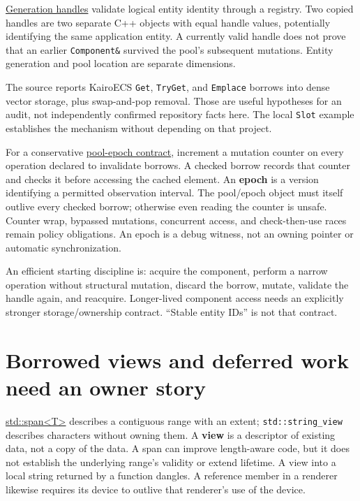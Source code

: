 \hyperref[appendix-f1581457d322]{Generation handles} validate logical entity identity through a registry. Two copied handles are two separate C++ objects with equal handle values, potentially identifying the same application entity. A currently valid handle does not prove that an earlier \texttt{Component\&} survived the pool's subsequent mutations. Entity generation and pool location are separate dimensions.

The source reports KairoECS \texttt{Get}, \texttt{TryGet}, and \texttt{Emplace} borrows into dense vector storage, plus swap-and-pop removal. Those are useful hypotheses for an audit, not independently confirmed repository facts here. The local \texttt{Slot} example establishes the mechanism without depending on that project.

For a conservative \hyperref[appendix-aa405b7c3903]{pool-epoch contract}, increment a mutation counter on every operation declared to invalidate borrows. A checked borrow records that counter and checks it before accessing the cached element. An \textbf{epoch} is a version identifying a permitted observation interval. The pool/epoch object must itself outlive every checked borrow; otherwise even reading the counter is unsafe. Counter wrap, bypassed mutations, concurrent access, and check-then-use races remain policy obligations. An epoch is a debug witness, not an owning pointer or automatic synchronization.

An efficient starting discipline is: acquire the component, perform a narrow operation without structural mutation, discard the borrow, mutate, validate the handle again, and reacquire. Longer-lived component access needs an explicitly stronger storage/ownership contract. ``Stable entity IDs'' is not that contract.

\section{Borrowed views and deferred work need an owner story}\label{01-foundations-i-ch003-borrowed-views-and-deferred-work-need-an-owner-story}

\hyperref[appendix-aea529eb5175]{std::span\textless T\textgreater{}} describes a contiguous range with an extent; \texttt{std::string\_view} describes characters without owning them. A \textbf{view} is a descriptor of existing data, not a copy of the data. A span can improve length-aware code, but it does not establish the underlying range's validity or extend lifetime. A view into a local string returned by a function dangles. A reference member in a renderer likewise requires its device to outlive that renderer's use of the device.

